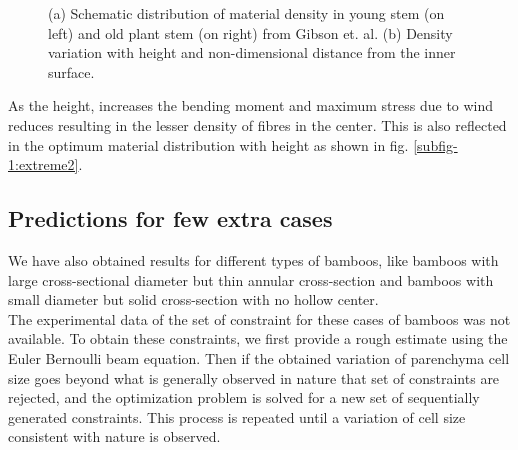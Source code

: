\documentclass[openright,twoside]{iitkthesis}
\begin{document}
\begin{figure}[H]
\begin{center}
{     }
    \label{fig:height}
    \caption{(a) Schematic distribution of material density in young stem (on left) and old plant stem (on right) from Gibson et. al. \cite{gibson1995mechanical} (b) Density variation with height and non-dimensional distance from the inner surface.}
\end{center}
\end{figure}
As the height, increases the bending moment and maximum stress due to wind reduces resulting in the lesser density of fibres in the center. This is also reflected in the optimum material distribution with height as shown in fig. \ref{subfig-1:extreme2}.

\subsection{Predictions for few extra cases}
We have also obtained results for different types of bamboos, like bamboos with large cross-sectional diameter but thin annular cross-section and bamboos with small diameter but solid cross-section with no hollow center.\\
The experimental data of the set of constraint for these cases of bamboos was not available. To obtain these constraints, we first provide a rough estimate using the Euler Bernoulli beam equation. Then if the obtained variation of parenchyma cell size goes beyond what is generally observed in nature that set of constraints are rejected, and the optimization problem is solved for a new set of sequentially generated constraints. This process is repeated until a variation of cell size consistent with nature is observed. 
\end{document}
